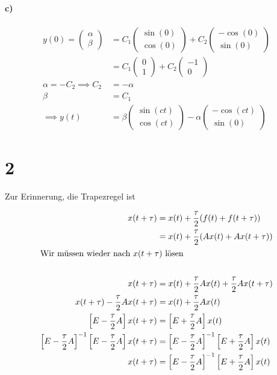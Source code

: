 \documentclass[ngerman,a4paper]{scrartcl}
\begin{document}
\paragraph{c)}

\begin{align*}
  y(0) =
  \begin{pmatrix}
    \alpha \\ \beta
  \end{pmatrix} &= C_1
  \begin{pmatrix}
    \sin(0)\\ \cos(0)
  \end{pmatrix} + C_2
  \begin{pmatrix}
    -\cos(0)\\ \sin(0)
  \end{pmatrix}\\
  &= C_1
  \begin{pmatrix}
    0 \\ 1
  \end{pmatrix} + C_2
  \begin{pmatrix}
    -1\\ 0
  \end{pmatrix}\\
\alpha = -C_2 \implies C_2 &= -\alpha\\
\beta &= C_1\\
\implies y(t) &= \beta
\begin{pmatrix}
  \sin(ct)\\ \cos(ct)
\end{pmatrix} - \alpha
\begin{pmatrix}
  -\cos(ct) \\ \sin(0)
\end{pmatrix}
\end{align*}
\section*{2}

Zur Erinnerung, die Trapezregel ist


\begin{align*}
  x(t+\tau) &= x(t) + \frac{\tau}{2} (f(t) + f(t + \tau))\\
  &= x(t) + \frac{\tau}{2} (Ax(t) + Ax(t + \tau))\\
  \intertext{Wir müssen wieder nach $x(t+\tau)$ lösen}\\
  x(t+\tau) &= x(t) + \frac{\tau}{2} Ax(t) + \frac{\tau}{2} Ax(t + \tau)\\
  x(t+\tau) - \frac{\tau}{2} Ax(t + \tau)&= x(t) + \frac{\tau}{2} Ax(t)\\
  \left[E  -\frac{\tau}{2} A\right] x(t+\tau) &= \left[E + \frac{\tau}{2} A\right] x(t)\\
  \left[E  -\frac{\tau}{2} A\right]^{-1} \left[E  -\frac{\tau}{2} A\right] x(t+\tau) &= \left[E  -\frac{\tau}{2} A\right]^{-1} \left[E + \frac{\tau}{2} A\right] x(t)\\
  x(t+\tau) &= \left[E  -\frac{\tau}{2} A\right]^{-1} \left[E + \frac{\tau}{2} A\right] x(t)
\end{align*}
\end{document}
